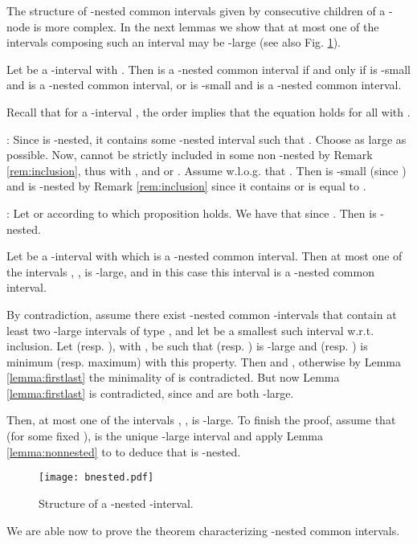 \documentclass{article}
\begin{document}
The structure of -nested common intervals given by consecutive children of a -node is more
complex. In the next lemmas we show that at most one of the intervals  composing
such an interval may be -large (see also Fig. \ref{bstruct}).
 
\begin{lemma}\label{lemma:firstlast}
 Let  be a -interval with . Then  is a -nested common 
 interval if and only if 
  is  -small and  is a -nested common  interval, or  is
 -small and  is a -nested common  interval.
\end{lemma}

\begin{preuve}
Recall that for a -interval , the order  implies that the equation
 holds
for all  with . 

: Since  is -nested, it contains some -nested interval  such that .
Choose  as large as possible. Now,  cannot be strictly included in some non -nested  by Remark \ref{rem:inclusion}, thus
 with , and  or .
Assume w.l.o.g. that . Then  is -small (since )
and  is -nested by Remark \ref{rem:inclusion} since it contains  or is
equal to .

: Let  or  according to which proposition holds. We have that  since . 
Then  is -nested.
\end{preuve}

\begin{lemma}\label{lemma:not2large}
 Let  be a -interval with  which is a -nested common 
interval. Then at most one of the intervals , , is -large, and in
this case this interval is a -nested common  interval. 
\end{lemma}

\begin{preuve}
By contradiction, assume there exist -nested common -intervals that contain at least two
-large intervals of type , and let  be a smallest  such interval 
w.r.t. inclusion. Let  (resp. ), with , be such that
 (resp. ) is -large and  (resp. ) is minimum (resp. maximum) with this
property. Then  and , otherwise by Lemma \ref{lemma:firstlast} the minimality of
 is contradicted. But now Lemma \ref{lemma:firstlast} is contradicted, since  and
 are both -large. 

Then, at most one of the intervals , , is -large. To finish the proof, 
assume that  (for some fixed ), is the unique -large interval and 
apply Lemma \ref{lemma:nonnested} to  to deduce that  is -nested.
\end{preuve}

\begin{figure}[t]
\vspace{-0.3cm}
  \centering
\texttt{[image: bnested.pdf]} 
\caption{Structure of a -nested -interval. }
 \label{bstruct}
\vspace{-0.3cm}
\end{figure}
We are able now to prove the theorem characterizing -nested common  intervals.
\end{document}
